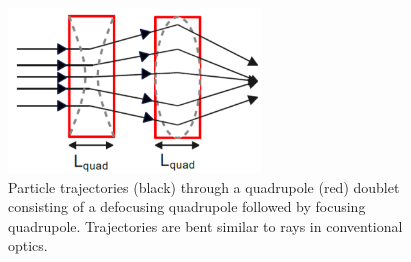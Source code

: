 \documentclass[../main.tex]{subfiles}
\begin{document}
\begin{figure}[!h]
\centering
\includegraphics[width=0.6\textwidth]{Figures/Energy_Recovery_Linac_Design/Quad_Doublet_fixed.pdf}
\caption{Particle trajectories (black) through a quadrupole (red) doublet consisting of a defocusing quadrupole followed by focusing quadrupole. Trajectories are bent similar to rays in conventional optics.}
\label{fig:quad_doublet}
\end{figure}
\end{document}
